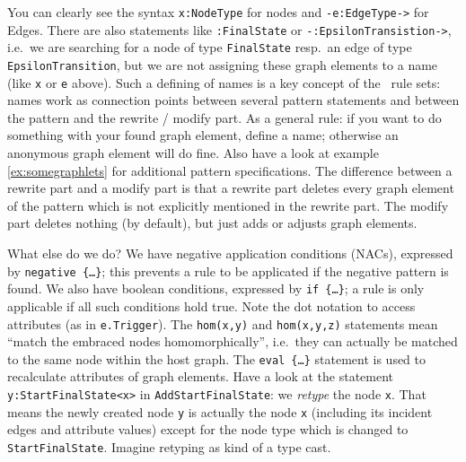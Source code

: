 You can clearly see the syntax \texttt{x:NodeType} for nodes and \texttt{-e:EdgeType->} for Edges.
There are also statements like \texttt{:FinalState} or \texttt{-:EpsilonTransistion->}, i.e.\ we are searching for a node of type \texttt{FinalState} resp.\ an edge of type \texttt{EpsilonTransition}, but we are not assigning these graph elements to a name (like \texttt{x} or \texttt{e} above).
Such a defining of names is a key concept of the \GrG\ rule sets: names work as connection points between several pattern statements and between the pattern and the rewrite / modify part.
As a general rule: if you want to do something with your found graph element, define a name; otherwise an anonymous graph element will do fine.
Also have a look at example \ref{ex:somegraphlets} for additional pattern specifications.
The difference between a rewrite part and a modify part is that a rewrite part deletes every graph element of the pattern which is not explicitly mentioned in the rewrite part.
The modify part deletes nothing (by default), but just adds or adjusts graph elements.

What else do we do? 
We have negative application conditions (NACs), expressed by \texttt{negative \{\dots\}}; this prevents a rule to be applicated if the negative pattern is found.
We also have boolean conditions, expressed by \texttt{if \{\dots\}}; a rule is only applicable if all such conditions hold true.
Note the dot notation to access attributes (as in \texttt{e.Trigger}).
The \texttt{hom(x,y)} and \texttt{hom(x,y,z)} statements mean ``match the embraced nodes homomorphically'', i.e.\ they can actually be matched to the same node within the host graph.
The \texttt{eval \{\dots\}} statement is used to recalculate attributes of graph elements.
Have a look at the statement \texttt{y:StartFinalState<x>} in \texttt{AddStartFinalState}: we \emph{retype} the node \texttt{x}.
That means the newly created node \texttt{y} is actually the node \texttt{x} (including its incident edges and attribute values) except for the node type which is changed to \texttt{StartFinalState}.
Imagine retyping as kind of a type cast.

